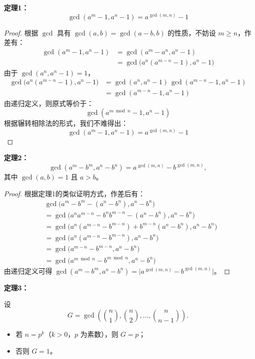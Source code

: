 \textbf{定理1：}
\[
\gcd(a^m - 1, a^n - 1) = a^{\gcd(m, n)} - 1
\]

\begin{proof}

根据 $\gcd$ 具有 $\gcd(a, b) = \gcd(a - b, b)$ 的性质，不妨设 $m \ge n$，作差有：
\[
\begin{aligned}
\gcd(a^m - 1, a^n - 1) &= \gcd(a^m - a^n, a^n - 1) \\
&= \gcd\bigl(a^n(a^{m - n} - 1), a^n - 1\bigr)
\end{aligned}
\]
由于 $\gcd(a^n, a^n - 1) = 1$，
\[
\begin{aligned}
\gcd\bigl(a^n(a^{m - n} - 1), a^n - 1\bigr)
&= \gcd(a^n, a^n - 1)\,\gcd(a^{m - n} - 1, a^n - 1) \\
&= \gcd(a^{m - n} - 1, a^n - 1)
\end{aligned}
\]
由递归定义，则原式等价于：
\[
\gcd(a^{m \bmod n} - 1, a^n - 1)
\]
根据辗转相除法的形式，我们不难得出：
\[
\gcd(a^m - 1, a^n - 1) = a^{\gcd(m, n)} - 1
\]

\end{proof}

\textbf{定理2：}
\[
\gcd(a^m - b^m, a^n - b^n) = a^{\gcd(m, n)} - b^{\gcd(m, n)},
\]
其中 $\gcd(a, b) = 1$ 且 $a > b$。

\begin{proof}

根据定理1的类似证明方式，作差后有：
\[
\begin{aligned}
&\gcd\bigl(a^m - b^m - (a^n - b^n), a^n - b^n\bigr) \\
&= \gcd\bigl(a^n a^{m-n} - b^n b^{m-n} - (a^n - b^n), a^n - b^n\bigr) \\
&= \gcd\bigl(a^n(a^{m-n} - b^{m-n}) + b^{m-n}(a^n - b^n), a^n - b^n\bigr) \\
&= \gcd\bigl(a^n(a^{m-n} - b^{m-n}), a^n - b^n\bigr) \\
&= \gcd\bigl(a^{m-n} - b^{m-n}, a^n - b^n\bigr) \\
&= \gcd\bigl(a^{m \bmod n} - b^{m \bmod n}, a^n - b^n\bigr)
\end{aligned}
\]
由递归定义可得 $\gcd(a^m - b^m, a^n - b^n) = \bigl| a^{\gcd(m, n)} - b^{\gcd(m, n)} \bigr|$。

\end{proof}

\textbf{定理3：}

设
\[
G = \gcd\left(\binom{n}{1}, \binom{n}{2}, \ldots, \binom{n}{n-1}\right).
\]
\begin{itemize}
\item 若 $n = p^k$（$k>0$，$p$ 为素数），则 $G = p$；
\item 否则 $G = 1$。
\end{itemize}

